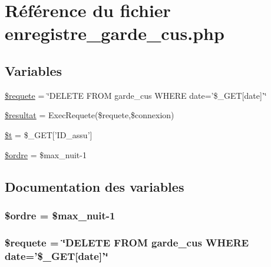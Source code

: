 \hypertarget{enregistre__garde__cus_8php}{
\section{R\'{e}f\'{e}rence du fichier enregistre\_\-garde\_\-cus.php}
\label{enregistre__garde__cus_8php}
}
\subsection*{Variables}
\begin{CompactItemize}
\item 
\hyperlink{enregistre__garde__cus_8php_a0}{\$requete} = \char`\"{}DELETE FROM garde\_\-cus WHERE date='\$\_\-GET\mbox{[}date\mbox{]}'\char`\"{}
\item 
\hyperlink{enregistre__garde__cus_8php_a1}{\$resultat} = Exec\-Requete(\$requete,\$connexion)
\item 
\hyperlink{enregistre__garde__cus_8php_a2}{\$t} = \$\_\-GET\mbox{[}'ID\_\-assu'\mbox{]}
\item 
\hyperlink{enregistre__garde__cus_8php_a3}{\$ordre} = \$max\_\-nuit-1
\end{CompactItemize}


\subsection{Documentation des variables}
\hypertarget{enregistre__garde__cus_8php_a3}{
\subsubsection[\$ordre]{\setlength{\rightskip}{0pt plus 5cm}\$ordre = \$max\_\-nuit-1}}
\label{enregistre__garde__cus_8php_a3}


\hypertarget{enregistre__garde__cus_8php_a0}{
\subsubsection[\$requete]{\setlength{\rightskip}{0pt plus 5cm}\$requete = \char`\"{}DELETE FROM garde\_\-cus WHERE date='\$\_\-GET\mbox{[}date\mbox{]}'\char`\"{}}}
\label{enregistre__garde__cus_8php_a0}


